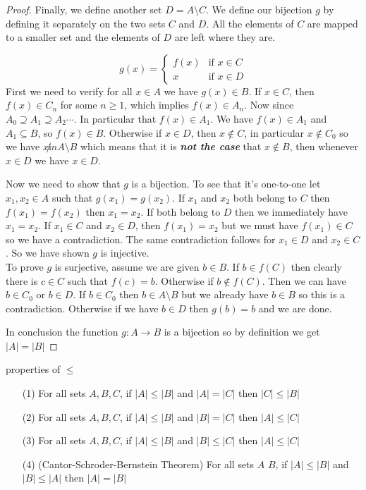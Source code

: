 \documentclass[16pt,a4paper]{article}
\theoremstyle{definition}
\begin{document}
\begin{proof}
Finally, we define another set $D = A\setminus C$. We define our bijection $g$ by  defining it separately on the two sets $C$ and $D$. All the elements of $C$ are mapped to a smaller set and the elements of $D$ are left where they are. 

\[
g(x) = \begin{cases}
f(x) & \text{if $x \in C$}\\
x & \text{if $x \in D$}
\end{cases}
\]  
First we need to verify for all $x\in A$ we have $g(x) \in B$. If $x \in C$, then $f(x) \in C_n$ for some $n\geq 1$, which implies $f(x) \in A_n$. Now since $A_0 \supseteq A_1 \supseteq A_2 \cdots$. In particular that $f(x) \in A_1$. We have $f(x) \in A_1$ and $A_1 \subseteq B$, so $f(x) \in B$. Otherwise if $x \in D$, then $x \notin C$, in particular $x\notin C_0$ so we have $x\not in A\setminus B$ which means that it is \textbf{\textit{not the case }}that $x\notin B$, then whenever $x\in D$ we have $x\in D$. 

Now we need to show that $g$ is a bijection. To see that it's one-to-one let $x_1, x_2 \in A$ such that $g(x_1) = g(x_2)$. If $x_1$ and $x_2$ both belong to $C$ then $f(x_1) = f(x_2)$ then $x_1 = x_2$. If both belong to $D$ then we immediately have $x_1 = x_2$. If $x_1 \in C$ and $x_2 \in D$, then $f(x_1) = x_2$ but we must have $f(x_1) \in C$ so we have a contradiction. The same contradiction follows for $x_1 \in D$ and $x_2 \in C$. So we have shown $g$ is injective. \\

To prove $g$ is surjective, assume we are given $b\in B$. If $b\in f(C)$ then clearly there is $c\in C$ such that $f(c) = b$. Otherwise if $b\notin f(C)$. Then we can have $b \in C_0$ or $b \in D$. If $b \in C_0$ then $b\in A\setminus B$ but we already have $b\in B$ so this is a contradiction. Otherwise if we have $b\in D$ then $g(b) = b$ and we are done. 

In conclusion the function $g:A\rightarrow B$ is a bijection so by definition we get $|A|= |B|$ 
\end{proof}

\begin{thm}{properties of $\leq$}{}
\begin{itemize}
\item[(1)] For all sets $A, B, C$, if $|A|\leq |B|$ and $|A|=|C|$ then $|C|\leq |B|$ 

\item[(2)] For all sets $A, B, C$, if $|A|\leq |B|$ and $|B|=|C|$ then $|A|\leq |C|$

\item[(3)] For all sets $A, B, C$, if $|A|\leq |B|$ and $|B|\leq |C|$ then $|A|\leq |C|$

\item[(4)] (Cantor-Schroder-Bernstein Theorem)  For all sets $A$ $B$, if $|A|\leq |B|$ and $|B| \leq |A|$ then $|A| = |B|$
 
\end{itemize}
\end{thm}
\end{document}
